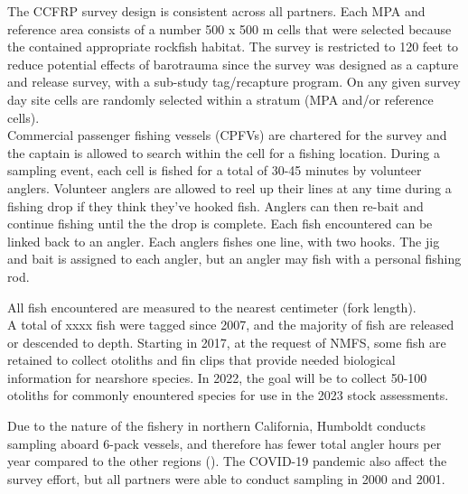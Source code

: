 \documentclass[
]{article}
\begin{document}
The CCFRP survey design is consistent across all partners. Each MPA and reference
area consists of a number 500 x 500 m cells that were selected because the contained
appropriate rockfish habitat. The survey is restricted to 120 feet to reduce
potential effects of barotrauma since the survey was designed as a capture
and release survey, with a sub-study tag/recapture program. On any given survey
day site cells are randomly selected within a stratum (MPA and/or reference cells).\\
Commercial passenger fishing vessels (CPFVs) are chartered for the survey and
the captain is allowed to search within the cell for a fishing location. During
a sampling event, each cell is fished for a total of 30-45 minutes by volunteer
anglers. Volunteer anglers are allowed to reel up their lines at any time during a
fishing drop if they think they've hooked fish. Anglers can then re-bait and
continue fishing until the the drop is complete. Each fish encountered
can be linked back to an angler. Each anglers fishes one line, with two hooks.
The jig and bait is assigned to each angler, but an angler may fish with a personal
fishing rod.

All fish encountered are measured to the nearest centimeter (fork length).\\
A total of xxxx fish were tagged since 2007, and the majority of fish are
released or descended to depth. Starting in 2017, at the request of NMFS, some
fish are retained to collect otoliths and fin clips that provide needed
biological information for nearshore species. In 2022, the goal will be to collect
50-100 otoliths for commonly enountered species for use in the 2023 stock assessments.

Due to the nature of the fishery in northern California, Humboldt conducts
sampling aboard 6-pack vessels, and therefore has fewer total angler hours per
year compared to the
other regions (). The COVID-19 pandemic also affect the survey effort, but all
partners were able to conduct sampling in 2000 and 2001.
\end{document}
